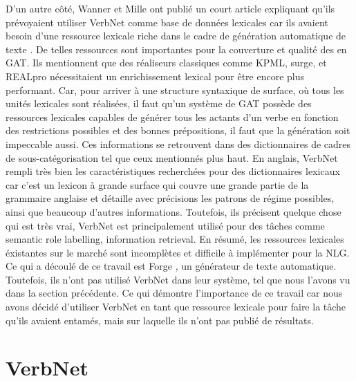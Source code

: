 D'un autre côté, Wanner et Mille ont publié un court article expliquant qu'ils prévoyaient utiliser VerbNet comme base de données lexicales car ils avaient besoin d'une ressource lexicale riche dans le cadre de génération automatique de texte \citep{MilleLargeCoverageDetailed2015}. De telles ressources sont importantes pour la couverture et qualité des en GAT. Ils mentionnent que des réaliseurs classiques comme KPML, surge, et REALpro  nécessitaient un enrichissement lexical pour être encore plus performant. Car, pour arriver à une structure syntaxique de surface, où tous les unités lexicales sont réalisées, il faut qu'un système de GAT possède des ressources lexicales capables de générer tous les actants d'un verbe en fonction des restrictions possibles et des bonnes prépositions, il faut que la génération soit impeccable aussi. Ces informations se retrouvent dans des dictionnaires de cadres de sous-catégorisation tel que ceux mentionnés plus haut. En anglais, VerbNet rempli très bien les caractéristiques recherchées pour des dictionnaires lexicaux car c'est un lexicon à grande surface qui couvre une grande partie de la grammaire anglaise et détaille avec précisions les patrons de régime possibles, ainsi que beaucoup d'autres informations. Toutefois, ils précisent quelque chose qui est très vrai, VerbNet est principalement utilisé pour des tâches comme semantic role labelling, information retrieval. En résumé, les ressources lexicales éxistantes sur le marché sont incomplètes et difficile à implémenter pour la NLG. Ce qui a découlé de ce travail est Forge \citep{DBLP:conf/semeval/MilleCBW17}, un générateur de texte automatique. Toutefois, ils n'ont pas utilisé VerbNet dans leur système, tel que nous l'avons vu dans la section précédente. Ce qui démontre l'importance de ce travail car nous avons décidé d'utiliser VerbNet en tant que ressource lexicale pour faire la tâche qu'ils avaient entamés, mais sur laquelle ils n'ont pas publié de résultats.



\section{VerbNet}

